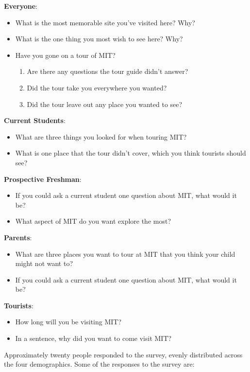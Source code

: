 \documentclass{sigchi}
\begin{document}
\textbf{Everyone}:

\begin{itemize}
	\item What is the most memorable site you've visited here? Why?
	\item What is the one thing you most wish to see here? Why?
	\item Have you gone on a tour of MIT?
	\begin{enumerate}
		\item Are there any questions the tour guide didn't answer?
		\item Did the tour take you everywhere you wanted?
		\item Did the tour leave out any place you wanted to see?
	\end{enumerate}
\end{itemize}

\textbf{Current Students}:
\begin{itemize}
	\item What are three things you looked for when touring MIT?
	\item What is one place that the tour didn't cover, which you think tourists should see?
\end{itemize}

\textbf{Prospective Freshman}:
\begin{itemize}
	\item If you could ask a current student one question about MIT, what would it be?
	\item What aspect of MIT do you want explore the most?
\end{itemize}

\textbf{Parents}:
\begin{itemize}
	\item What are three places you want to tour at MIT that you think your child might not want to?
	\item If you could ask a current student one question about MIT, what would it be?
\end{itemize}

\textbf{Tourists}:
\begin{itemize}
	\item How long will you be visiting MIT?
	\item In a sentence, why did you want to come visit MIT?
\end{itemize}

Approximately twenty people responded to the survey, evenly distributed across the four demographics. Some of the responses to the survey are:
\end{document}
